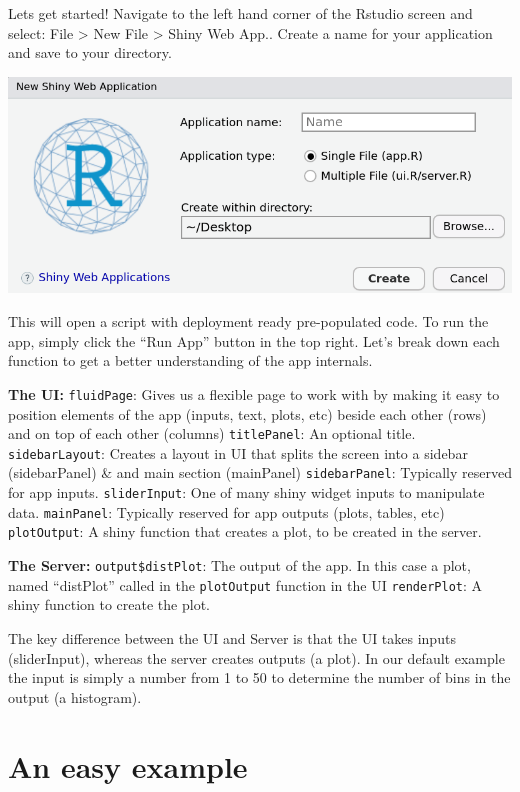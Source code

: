 \documentclass[
]{book}
\begin{document}
Lets get started! Navigate to the left hand corner of the Rstudio screen and select: File \textgreater{} New File \textgreater{} Shiny Web App.. Create a name for your application and save to your directory.

\includegraphics{img/new_shiny_app.png}

This will open a script with deployment ready pre-populated code. To run the app, simply click the ``Run App'' button in the top right. Let's break down each function to get a better understanding of the app internals.

\textbf{The UI:}
\texttt{fluidPage}: Gives us a flexible page to work with by making it easy to position elements of the app (inputs, text, plots, etc) beside each other (rows) and on top of each other (columns)
\texttt{titlePanel}: An optional title.
\texttt{sidebarLayout}: Creates a layout in UI that splits the screen into a sidebar (sidebarPanel) \& and main section (mainPanel)
\texttt{sidebarPanel}: Typically reserved for app inputs.
\texttt{sliderInput}: One of many shiny widget inputs to manipulate data.
\texttt{mainPanel}: Typically reserved for app outputs (plots, tables, etc)
\texttt{plotOutput}: A shiny function that creates a plot, to be created in the server.

\textbf{The Server:}
\texttt{output\$distPlot}: The output of the app. In this case a plot, named ``distPlot'' called in the \texttt{plotOutput} function in the UI
\texttt{renderPlot}: A shiny function to create the plot.

The key difference between the UI and Server is that the UI takes inputs (sliderInput), whereas the server creates outputs (a plot). In our default example the input is simply a number from 1 to 50 to determine the number of bins in the output (a histogram).

\hypertarget{an-easy-example}{%
\section*{An easy example}\label{an-easy-example}}
\end{document}
